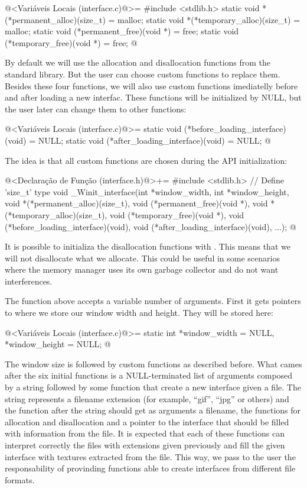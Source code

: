 \iniciocodigo
@<Variáveis Locais (interface.c)@>=
#include <stdlib.h>
static void *(*permanent_alloc)(size_t) = malloc;
static void *(*temporary_alloc)(size_t) = malloc;
static void (*permanent_free)(void *) = free;
static void (*temporary_free)(void *) = free;
@
\fimcodigo

By default we will use the allocation and disallocation functions from
the standard library. But the user can choose custom functions to
replace them. Besides these four functions, we will also use custom
functions imediatelly before and after loading a new interfac. These
functions will be initialized by NULL, but the user later can change
them to other functions:

\iniciocodigo
@<Variáveis Locais (interface.c)@>=
static void (*before_loading_interface)(void) = NULL;
static void (*after_loading_interface)(void) = NULL;
@
\fimcodigo

The idea is that all custom functions are chosen during the API
initialization:

\iniciocodigo
@<Declaração de Função (interface.h)@>+=
#include <stdlib.h> // Define  'size_t' type
void _Winit_interface(int *window_width, int *window_height,
                      void *(*permanent_alloc)(size_t),
                      void (*permanent_free)(void *),
                      void *(*temporary_alloc)(size_t),
                      void (*temporary_free)(void *),
                      void (*before_loading_interface)(void),
                      void (*after_loading_interface)(void),
                      ...);
@
\fimcodigo

It is possible to initializa the disallocation functions with
. This means that we will not disallocate what we
allocate. This could be useful in some scenarios where the memory
manager uses its own garbage collector and do not want interferences.

The function above accepts a variable number of arguments. First it
gets pointers to where we store our window width and height. They will
be stored here:

\iniciocodigo
@<Variáveis Locais (interface.c)@>=
static int *window_width = NULL, *window_height = NULL;
@
\fimcodigo

The window size is followed by custom functions as described before.
What cames after the six initial functions is a NULL-terminated list
of arguments composed by a string followed by some function that
create a new interface given a file. The string represents a filename
extension (for example, ``gif'', ``jpg'' or others) and the function
after the string should get as arguments a filename, the functions for
allocation and disallocation and a pointer to the interface that
should be filled with information from the file. It is expected that
each of these functions can interpret correctly the files with
extensions given previously and fill the given interface with textures
extracted from the file. This way, we pass to the user the
responsability of provinding functions able to create interfaces from
different file formats.

